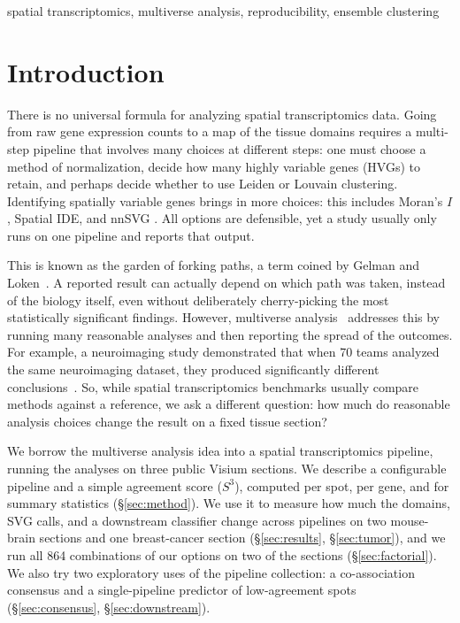 \documentclass[conference]{IEEEtran}
\begin{document}
\begin{IEEEkeywords}
spatial transcriptomics, multiverse analysis,
reproducibility, ensemble clustering
\end{IEEEkeywords}

\section{Introduction}
\label{sec:intro}

There is no universal formula for analyzing spatial transcriptomics data. Going from raw gene expression counts to a map of the tissue domains requires a multi-step pipeline that involves many choices at different steps: one must choose a method of normalization, decide how many highly variable genes (HVGs) to retain, and perhaps decide whether to use Leiden \cite{traag2019louvain} or Louvain \cite{blondel2008fast} clustering. Identifying spatially variable genes brings in more choices: this includes Moran's $I$, Spatial IDE, and nnSVG \cite{moran1950notes, svensson2018spatialde, weber2023nnsvg}. All options are defensible, yet a study usually only runs on one pipeline and reports that output. 

This is known as the garden of forking paths, a term coined by Gelman and Loken~\cite{gelman2013garden}. A reported result can actually depend on which path was taken, instead of the biology itself, even without deliberately cherry-picking the most statistically significant findings. However, multiverse analysis~\cite{steegen2016increasing} addresses
this by running many reasonable analyses and then reporting the spread of the outcomes. For example, a neuroimaging study demonstrated that when 70 teams analyzed the same neuroimaging dataset, they produced significantly different conclusions~\cite{botvinik2020variability}. So, while spatial transcriptomics benchmarks usually compare methods against a reference, we ask a different question: how much do reasonable analysis choices change the result on a fixed tissue section? 

We borrow the multiverse analysis idea into a spatial transcriptomics pipeline, running the analyses on three public Visium sections. We describe a configurable pipeline and a simple agreement score ($S^3$),
computed per spot, per gene, and for summary statistics
(\S\ref{sec:method}). We use it to measure how much the domains, SVG calls,
and a downstream classifier change across pipelines on two mouse-brain
sections and one breast-cancer section (\S\ref{sec:results},
\S\ref{sec:tumor}), and we run all 864 combinations of our options on two
of the sections (\S\ref{sec:factorial}). We also try two exploratory uses
of the pipeline collection: a co-association consensus and a
single-pipeline predictor of low-agreement spots (\S\ref{sec:consensus},
\S\ref{sec:downstream}).
\end{document}

